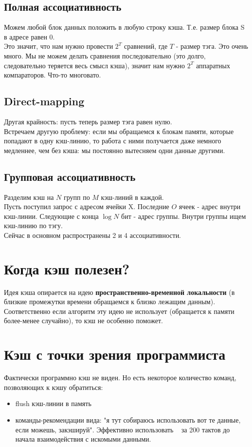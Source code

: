 \documentclass[12pt, a4paper]{article}
\begin{document}
\subsection{Полная ассоциативность}
Можем любой блок данных положить в любую строку кэша. Т.е. размер блока S в адресе равен 0.\\
Это значит, что нам нужно провести $2^T$ сравнений, где $T$ - размер тэга. Это очень много. Мы не можем делать сравнения последовательно (это долго, следовательно теряется весь смысл кэша), значит нам нужно $2^T$ аппаратных компараторов. Что-то многовато.
\subsection{Direct-mapping}
Другая крайность: пусть теперь размер тэга равен нулю.\\ Встречаем другую проблему: если мы обращаемся к блокам памяти, которые попадают в одну кэш-линию, то работа с ними получается даже немного медленнее, чем без кэша: мы постоянно вытесняем одни данные другими.
\subsection{Групповая ассоциативность}
Разделим кэш на $N$ групп по $M$ кэш-линий в каждой.\\
Пусть поступил запрос с адресом ячейки X. Последние $O$ ячеек - адрес внутри кэш-линии. Следующие с конца $\log N$ бит - адрес группы. Внутри группы ищем кэш-линию по тэгу.\\
Сейчас в основном распространены 2 и 4 ассоциативности.
\section{Когда кэш полезен?}
Идея кэша опирается на идею \textbf{пространственно-временной локальности} (в близкие промежутки времени обращаемся к близко лежащим данным). Соответственно если алгоритм эту идею не использует (обращается к памяти более-менее случайно), то кэш не особенно поможет.
\section{Кэш с точки зрения программиста}
Фактически программно кэш не виден. Но есть некоторое количество команд, позволяющих к кэшу обратиться:
\begin{itemize}
    \item flush кэш-линии в память
    \item команды-рекомендации вида: "я тут собираюсь использовать вот те данные, если можешь, закэшируй". Эффективно использовать ~ за 200 тактов до начала взаимодействия с искомыми данными.
\end{itemize}
\end{document}
